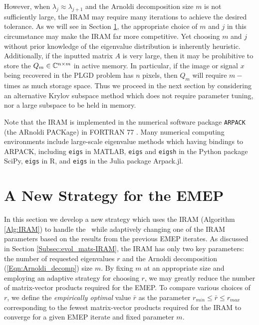 However, when $\lambda_j \approx \lambda_{j+1}$ and the Arnoldi decomposition size $m$ is not sufficiently large, the IRAM may require many iterations to achieve the desired tolerance. 
 As we will see in Section \ref{Subsec:evol_mats-adaptive_IRAM}, the appropriate choice of $m$ and $j$ in this circumstance may make the IRAM far more competitive.  
Yet choosing $m$ and $j$ without prior knowledge of the eigenvalue distribution is inherently heuristic.  
Additionally, if the inputted matrix $A$ is very large, then it may be prohibitive to store the $Q_m \in {\mathbb C}^{n \times m}$ in active memory.  In particular, if the image or signal $x$ being recovered in the PLGD problem has $n$ pixels, then $Q_m$ will require $m-$times as much storage space.  
Thus we proceed in the next section by considering an alternative Krylov subspace method which does not require parameter tuning, nor a large subspace to be held in memory.


Note that the IRAM is implemented in the numerical software package \texttt{ARPACK} (the ARnoldi PACKage) in FORTRAN 77 \cite{lehoucq1998arpack}.  Many numerical computing environments include large-scale eigenvalue methods which having bindings to ARPACK, including \texttt{eigs} in MATLAB, \texttt{eigs} and \texttt{eigsh} in the Python package SciPy, \texttt{eigs} in R, and \texttt{eigs} in the Julia package Arpack.jl. 







\section{A New Strategy for the EMEP}
\label{Subsec:evol_mats-adaptive_IRAM}


In this section we develop a new strategy which uses the IRAM (Algorithm \ref{Alg:IRAM}) to handle the \emep \ while adaptively changing one of the IRAM parameters based on the results from the previous EMEP iterates.
As discussed in Section \ref{Subsec:evol_mats-IRAM}, the IRAM has only two key parameters: the number of requested eigenvalues $r$ and the Arnoldi decomposition (\ref{Eqn:Arnoldi_decomp}) size $m$.
By fixing $m$ at an appropriate size and employing an adaptive strategy for choosing $r$, we may greatly reduce the number of matrix-vector products required for the EMEP.
To compare various choices of $r$, we define the \textit{empirically optimal} value $\bar{r}$ as the parameter $r_{min} \leq \bar{r} \leq r_{max}$ corresponding to the fewest matrix-vector products required for the IRAM to converge for a given EMEP iterate and fixed parameter $m$.


